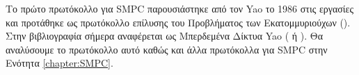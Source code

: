 Το πρώτο πρωτόκολλο για SMPC παρουσιάστηκε από τον Yao το 1986 στις εργασίες \cite{4568207} \cite{4568388} και προτάθηκε ως πρωτόκολλο επίλυσης του Προβλήματος των Εκατομμυριούχων (). Στην βιβλιογραφία σήμερα αναφέρεται ως Μπερδεμένα Δίκτυα Yao ( ή ). Θα αναλύσουμε το πρωτόκολλο αυτό καθώς και άλλα πρωτόκολλα για SMPC στην Ενότητα \ref{chapter:SMPC}.